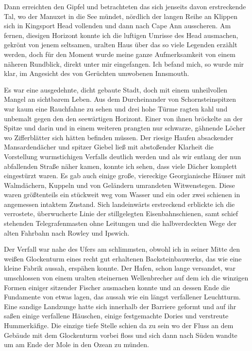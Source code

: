 Dann erreichten den Gipfel und betrachteten das sich jenseits davon erstreckende Tal, wo der Manuxet in die See mündet, nördlich der langen Reihe an Klippen sich in Kingsport Head vollenden und dann nach Cape Ann ausscheren. Am fernen, diesigen Horizont konnte ich die luftigen Umrisse des Head ausmachen, gekrönt von jenem seltsamen, uralten Haus über das so viele Legenden erzählt werden, doch für den Moment wurde meine ganze Aufmerksamkeit von einem näheren Rundblick, direkt unter mir eingefangen. Ich befand mich, so wurde mir klar, im Angesicht des von Gerüchten umwobenen Innsmouth.

Es war eine ausgedehnte, dicht gebaute Stadt, doch mit einem unheilvollen Mangel an sichtbarem Leben. Aus dem Durcheinander von Schornsteinspitzen war kaum eine Rauchfahne zu sehen und drei hohe Türme ragten kahl und unbemalt gegen den den seewärtigen Horizont. Einer von ihnen bröckelte an der Spitze und darin und  in einem weiteren prangten nur schwarze, gähnende Löcher wo Zifferblätter sich hätten befinden müssen. Der riesige Haufen absackender Mansardendächer und spitzer Giebel ließ mit abstoßender Klarheit die Vorstellung wurmstichigen Verfalls deutlich werden und als wir entlang der nun abfallenden Straße näher kamen, konnte ich sehen, dass viele Dächer komplett eingestürzt waren. Es gab auch einige große, viereckige Georgianische Häuser mit Walmdächern, Kuppeln und von Geländern umrandeten Witwenstegen. Diese waren größtenteils ein stückweit weg vom Wasser und ein oder zwei schienen in angemessen intaktem Zustand. Sich landeinwärts erstreckend erblickte ich die verrostete, überwucherte Linie der stillgelegten Eisenbahnschienen, samt schief stehenden Telegrafenmasten ohne Leitungen und die halbverdeckten Wege der alten Fahrbahn nach Rowley und Ipswich.

Der Verfall war nahe des Ufers am schlimmsten, obwohl ich in seiner Mitte den weißen Glockenturm eines recht gut erhaltenen Backsteinbauwerks, das wie eine kleine Fabrik aussah, erspähen konnte. Der Hafen, schon lange versandet, war umschlossen von einem uralten steinernen Wellenbrecher auf dem ich die winzigen Formen einiger sitzender Fischer ausmachen konnte und an dessen Ende die Fundamente von etwas lagen, das aussah wie ein längst verfallener Leuchtturm. Eine sandige Landzunge hatte sich innerhalb der Barriere geformt und auf ihr saßen einige verfallene Häuschen, einige festgemachte Dories und verstreute Hummerkäfige. Die einzige tiefe Stelle schien da zu sein wo der Fluss an dem Gebäude mit dem Glockenturm vorbei floss und sich dann nach Süden wandte um am Ende der Mole in den Ozean zu münden.

